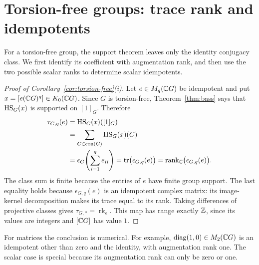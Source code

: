 \section{Torsion-free groups: trace rank and idempotents}
\label{sec:torsion-free}

For a torsion-free group, the support theorem leaves only the identity
conjugacy class. We first identify its coefficient with augmentation
rank, and then use the two possible scalar ranks to determine scalar
idempotents.

\begin{proof}[Proof of Corollary~\ref{cor:torsion-free}\textup{(i)}]
Let $e\in M_q(\mathbb C G)$ be idempotent and put
$x=[e(\mathbb C G)^q]\in K_0(\mathbb C G)$. Since $G$ is torsion-free,
Theorem~\ref{thm:bass} says that $\operatorname{HS}_G(x)$ is supported on $[1]_G$.
Therefore
\begin{align}
 \tau_{G,q}(e)
 &=\operatorname{HS}_G(x)([1]_G)\notag\\
 &=\sum_{C\in\operatorname{con}(G)}\operatorname{HS}_G(x)(C)\notag\\
 &=\epsilon_G\!\left(\sum_{i=1}^q e_{ii}\right)
 =\operatorname{tr}\bigl(\epsilon_{G,q}(e)\bigr)
 =\operatorname{rank}_{\mathbb C}\bigl(\epsilon_{G,q}(e)\bigr).
 \label{eq:torsion-free-rank}
\end{align}
The class sum is finite because the entries of $e$ have finite group
support. The last
equality holds because $\epsilon_{G,q}(e)$ is an idempotent complex
matrix: its image-kernel decomposition makes its trace equal to its
rank. Taking differences of projective classes gives
$\tau_{G,*}=\operatorname{rk}_{\epsilon}$. This map has range exactly
$\mathbb Z$, since its values are integers and $[\mathbb C G]$ has value $1$.
\end{proof}

For matrices the conclusion is numerical. For example,
$\operatorname{diag}(1,0)\in M_2(\mathbb C G)$ is an idempotent other than zero
and the identity, with augmentation rank one. The scalar case is special
because its augmentation rank can only be zero or one.

